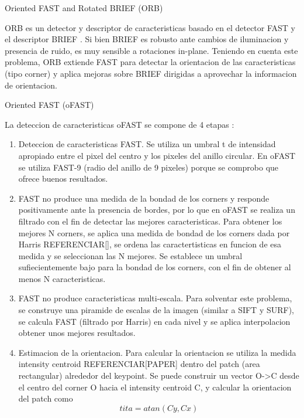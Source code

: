 \begin{subsection}
{Oriented FAST and Rotated BRIEF (ORB)}

ORB es un detector y descriptor \cite{RubleeRKB11} de caracteristicas basado en el detector FAST \cite{Rosten06machinelearning} y el descriptor BRIEF \cite{Calonder12}. Si bien BRIEF es robusto ante cambios de iluminacion y presencia de ruido, es muy sensible a rotaciones in-plane. Teniendo en cuenta este problema, ORB extiende FAST para detectar la orientacion de las caracteristicas (tipo corner) y aplica mejoras sobre BRIEF dirigidas a aprovechar la informacion de orientacion.

\begin{subsection}
{Oriented FAST (oFAST)}

La deteccion de caracteristicas oFAST se compone de 4 etapas :
\begin{enumerate}

\item Deteccion de caracteristicas FAST. Se utiliza un umbral t de intensidad apropiado entre el pixel del centro y los pixeles del anillo circular. En oFAST se utiliza FAST-9 (radio del anillo de 9 pixeles) porque se comprobo que ofrece buenos resultados.

\item FAST no produce una medida de la bondad de los corners y responde positivamente ante la presencia de bordes, por lo que en oFAST se realiza un filtrado con el fin de detectar las mejores caracteristicas. Para obtener los mejores N corners, se aplica una medida de bondad de los corners dada por Harris REFERENCIAR[], se ordena las caractertisticas en funcion de esa medida y se seleccionan las N mejores. Se establece un umbral sufiecientemente bajo para la bondad de los corners, con el fin de obtener al menos N caracteristicas.

\item FAST no produce caracteristicas multi-escala. Para solventar este problema, se construye una piramide de escalas de la imagen (similar a SIFT y SURF), se calcula FAST (filtrado por Harris) en cada nivel y se aplica interpolacion obtener unos mejores resultados. 

\item Estimacion de la orientacion. Para calcular la orientacion se utiliza la medida intensity centroid REFERENCIAR[PAPER] dentro del patch (area rectangular) alrededor del keypoint. Se puede construir un vector O->C desde el centro del corner O hacia el intensity centroid C, y calcular la orientacion del patch como 
\begin{equation}
tita = atan(Cy, Cx)
\end{equation}


\end{enumerate}
\end{subsection}
\end{subsection}
